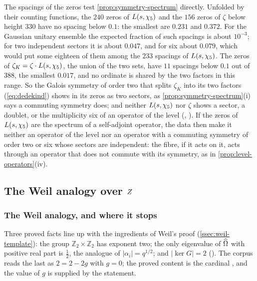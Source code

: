 The spacings of the zeros test \cref{prop:symmetry-spectrum} directly.  Unfolded by their counting functions, the
$240$ zeros of $L(s,\chi_5)$ and the $156$ zeros of $\zeta$ below height $330$ have no spacing below $0.1$: the smallest are
$0.231$ and $0.372$.  For the Gaussian unitary ensemble the expected fraction of such spacings is about $10^{-3}$; for two
independent sectors it is about $0.047$, and for six about $0.079$, which would put some eighteen of them among the
$233$ spacings of $L(s,\chi_5)$.  The zeros of $\zeta_K=\zeta\cdot L(s,\chi_5)$, the union of the two sets, have $11$
spacings below $0.1$ out of $388$, the smallest $0.017$, and no ordinate is shared by the two factors in this range.  So
the Galois symmetry of order two that splits $\zeta_K$ into its two factors (\cref{eq:dedekind}) shows in its zeros as
two sectors, as \cref{prop:symmetry-spectrum}\textup{(i)} says a commuting symmetry does; and neither $L(s,\chi_5)$ nor
$\zeta$ shows a sector, a doublet, or the multiplicity six of an operator of the level (,
).  If the zeros of $L(s,\chi_5)$ are the spectrum of a self-adjoint operator, the data
then make it neither an operator of the level nor an operator with a commuting symmetry of order two or six whose
sectors are independent: the fibre, if it acts on it, acts through an operator that does not commute with its symmetry, as in
\cref{prop:level-operators}\textup{(iv)}.

\subsection{The Weil analogy over $Z$}\label{sec:results-weil}

\subsubsection{The Weil analogy, and where it stops}\label{ssec:weil-analogy}

Three proved facts line up with the ingredients of Weil's proof
(\cref{ssec:weil-template}): the group $\mathbb{Z}_2\times\mathbb{Z}_2$ has
exponent two; the only eigenvalue of $\widehat{\Omega}$ with positive real part is
$\tfrac12$, the analogue of $|\alpha_i|=q^{1/2}$; and $|\ker G|=2$
().  The corpus reads the
last as $2=2-2g$ with $g=0$; the proved content is the
cardinal , and the value of $g$ is supplied by the statement.

